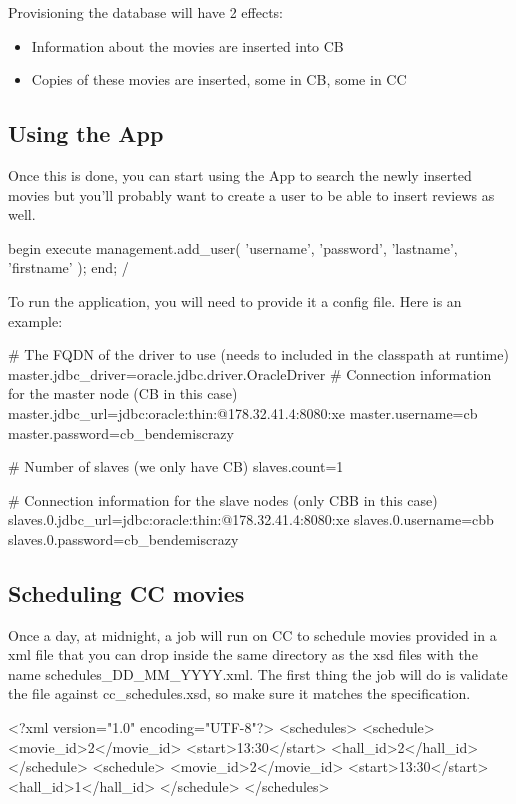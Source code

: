 \documentclass[a4paper]{article}
\begin{document}
Provisioning the database will have 2 effects:
\begin{itemize}
	\item Information about the movies are inserted into CB
	\item Copies of these movies are inserted, some in CB, some in CC
\end{itemize}

\subsection{Using the App}

Once this is done, you can start using the App to search the newly inserted movies but you'll probably want to create a user to be able to insert reviews as well.

\begin{sqlcode}
begin
    execute management.add_user(
        'username',
        'password',
        'lastname',
        'firstname'
    );
end;
/
\end{sqlcode}

To run the application, you will need to provide it a config file. Here is an example:
\begin{inicode}
# The FQDN of the driver to use (needs to included in the classpath at runtime)
master.jdbc_driver=oracle.jdbc.driver.OracleDriver
# Connection information for the master node (CB in this case)
master.jdbc_url=jdbc:oracle:thin:@178.32.41.4:8080:xe
master.username=cb
master.password=cb_bendemiscrazy

# Number of slaves (we only have CB)
slaves.count=1

# Connection information for the slave nodes (only CBB in this case)
slaves.0.jdbc_url=jdbc:oracle:thin:@178.32.41.4:8080:xe
slaves.0.username=cbb
slaves.0.password=cb_bendemiscrazy
\end{inicode}

\subsection{Scheduling CC movies}

Once a day, at midnight, a job will run on CC to schedule movies provided in a xml file that you can drop inside the same directory as the xsd files with the name schedules\_DD\_MM\_YYYY.xml. The first thing the job will do is validate the file against cc\_schedules.xsd, so make sure it matches the specification.

\begin{xmlcode}
<?xml version="1.0" encoding="UTF-8"?>
<schedules>
    <schedule>
        <movie_id>2</movie_id>
        <start>13:30</start>
        <hall_id>2</hall_id>
    </schedule>
    <schedule>
        <movie_id>2</movie_id>
        <start>13:30</start>
        <hall_id>1</hall_id>
    </schedule>
</schedules>
\end{xmlcode}
\end{document}
